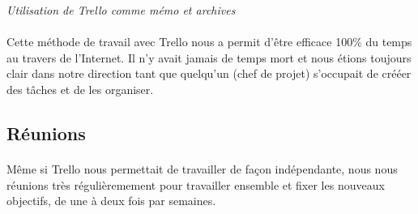 \noindent
{}
\begin{center}
\textit{Utilisation de Trello comme mémo et archives }
\end{center}

\paragraph{}
Cette méthode de travail avec Trello nous a permit d’être efficace 100\% du temps au travers de l’Internet. Il n’y avait jamais de temps mort et nous étions toujours clair dans notre direction tant que quelqu’un (chef de projet) s’occupait de crééer des tâches et de les organiser.

\subsection{Réunions}

\paragraph{}
Même si Trello nous permettait de travailler de façon indépendante, nous nous réunions très régulièremement pour travailler ensemble et fixer les nouveaux objectifs, de une à deux fois par semaines.

